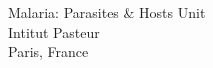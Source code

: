 \documentclass{letter} 					%
\begin{document}
\signature{Andree Valle Campos, MSc(c).}         %
\longindentation=0pt                    %
\let\raggedleft\raggedright             %
 
 
\begin{letter}{
		
		Malaria: Parasites \& Hosts Unit\\
		Intitut Pasteur\\
		Paris, France
		}



\end{letter}
\end{document}
